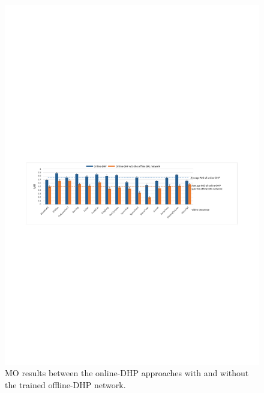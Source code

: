 \documentclass[10pt,journal,compsoc]{IEEEtran}
\begin{document}
\begin{figure}
	\begin{center}
		\centerline{\includegraphics[width=2\columnwidth]{figures/experiment_on_line/Mean_MO}}%
      \vspace{-2em}
		\caption{\footnotesize{MO results between the online-DHP approaches with and without the trained offline-DHP network.}}
		\label{Online_compare}
	\end{center}
\vspace{-2em}
\end{figure}
\end{document}

